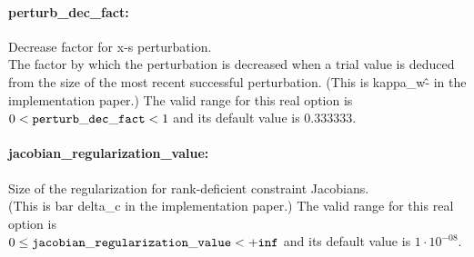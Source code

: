 \paragraph{perturb\_dec\_fact:} Decrease factor for x-s perturbation. $\;$ \\
 The factor by which the perturbation is decreased
when a trial value is deduced from the size of
the most recent successful perturbation. (This is
kappa\_w\^- in the implementation paper.) The valid range for this real option is 
$0 <  {\tt perturb\_dec\_fact } <  1$
and its default value is $0.333333$.


\paragraph{jacobian\_regularization\_value:} Size of the regularization for rank-deficient constraint Jacobians. $\;$ \\
 (This is bar delta\_c in the implementation
paper.) The valid range for this real option is\\ 
$0 \le {\tt jacobian\_regularization\_value } <  {\tt +inf}$
and its default value is $1 \cdot 10^{-08}$.




